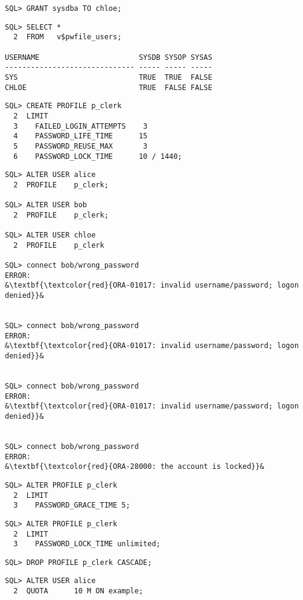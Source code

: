 \begin{enumerate}
\begin{lstlisting}[language=oracle_sql]
SQL> GRANT sysdba TO chloe;
      \end{lstlisting}
    
      \begin{lstlisting}[language=oracle_sql]
SQL> SELECT *
  2  FROM   v$pwfile_users;

USERNAME                       SYSDB SYSOP SYSAS
------------------------------ ----- ----- -----
SYS                            TRUE  TRUE  FALSE
CHLOE                          TRUE  FALSE FALSE
      \end{lstlisting}
    
      \begin{lstlisting}[language=oracle_sql]
SQL> CREATE PROFILE p_clerk
  2  LIMIT
  3    FAILED_LOGIN_ATTEMPTS    3
  4    PASSWORD_LIFE_TIME      15
  5    PASSWORD_REUSE_MAX       3
  6    PASSWORD_LOCK_TIME      10 / 1440;
      \end{lstlisting}
\clearpage
    
      \begin{lstlisting}[language=oracle_sql,alsolanguage=sqlplus]
SQL> ALTER USER alice
  2  PROFILE    p_clerk;

SQL> ALTER USER bob
  2  PROFILE    p_clerk;

SQL> ALTER USER chloe
  2  PROFILE    p_clerk

SQL> connect bob/wrong_password
ERROR:
&\textbf{\textcolor{red}{ORA-01017: invalid username/password; logon denied}}&


SQL> connect bob/wrong_password
ERROR:
&\textbf{\textcolor{red}{ORA-01017: invalid username/password; logon denied}}&


SQL> connect bob/wrong_password
ERROR:
&\textbf{\textcolor{red}{ORA-01017: invalid username/password; logon denied}}&


SQL> connect bob/wrong_password
ERROR:
&\textbf{\textcolor{red}{ORA-28000: the account is locked}}&
      \end{lstlisting}
    
      \begin{lstlisting}[language=oracle_sql]
SQL> ALTER PROFILE p_clerk
  2  LIMIT
  3    PASSWORD_GRACE_TIME 5;
      \end{lstlisting}
    
      \begin{lstlisting}[language=oracle_sql]
SQL> ALTER PROFILE p_clerk
  2  LIMIT
  3    PASSWORD_LOCK_TIME unlimited;
      \end{lstlisting}
    
      \begin{lstlisting}[language=oracle_sql]
SQL> DROP PROFILE p_clerk CASCADE;
      \end{lstlisting}
    
      \begin{lstlisting}[language=oracle_sql]
SQL> ALTER USER alice
  2  QUOTA      10 M ON example;


\end{lstlisting}
\end{enumerate}

